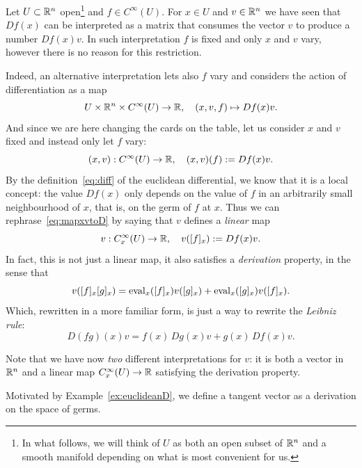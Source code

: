 \begin{example}\label{ex:euclideanD}
  Let $U\subset\mathbb{R}^n$ open\footnote{In what follows, we will think of $U$ as both an open subset of $\mathbb{R}^n$ and a smooth manifold depending on what is most convenient for us.} and $f\in C^\infty(U)$.
  For $x\in U$ and $v\in\mathbb{R}^n$ we have seen that $Df(x)$ can be interpreted as a matrix that consumes the vector $v$ to produce a number $Df(x)v$.
  In such interpretation $f$ is fixed and only $x$ and $v$ vary, however there is no reason for this restriction.

  Indeed, an alternative interpretation lets also $f$ vary and considers the action of differentiation as a map
  \begin{equation}
    U \times \mathbb{R}^n \times C^\infty(U) \to \mathbb{R},\quad
    (x,v,f) \mapsto Df(x) v.
  \end{equation}
  And since we are here changing the cards on the table, let us consider $x$ and $v$ fixed and instead only let $f$ vary:
  \begin{equation}\label{eq:mapxvtoD}
    (x,v):C^\infty(U) \to\mathbb{R}, \quad (x,v)(f) := Df(x)v.
  \end{equation}
  By the definition~\eqref{eq:diff} of the euclidean differential, we know that it is a local concept: the value $Df(x)$ only depends on the value of $f$ in an arbitrarily small neighbourhood of $x$, that is, on the germ of $f$ at $x$.
  Thus we can rephrase~\eqref{eq:mapxvtoD} by saying that $v$ defines a \emph{linear} map
  \begin{equation}
    v : C_x^\infty(U) \to \mathbb{R}, \quad
    v([f]_x) := Df(x) v.
  \end{equation}
  In fact, this is not just a linear map, it also satisfies a \emph{derivation} property, in the sense that
  \begin{equation}
    v([f]_x [g]_x) =
    \operatorname{eval}_x([f]_x)v([g]_x)
    + \operatorname{eval}_x([g]_x)v([f]_x).
  \end{equation}
  Which, rewritten in a more familiar form, is just a way to rewrite the \emph{Leibniz rule}:
  \begin{equation}
    D(fg)(x) v = f(x)\,Dg(x)v + g(x)\,Df(x)v.
  \end{equation}

  Note that we have now \emph{two} different interpretations for $v$: it is both a vector in $\mathbb{R}^n$ and a linear map $C_x^\infty(U) \to \mathbb{R}$ satisfying the derivation property.
\end{example}

Motivated by Example~\ref{ex:euclideanD}, we define a tangent vector as a derivation on the space of germs.

